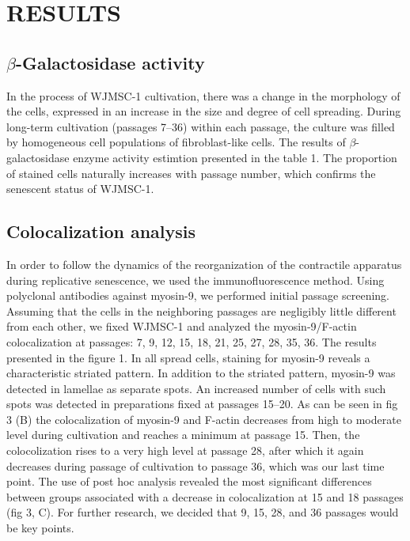 \documentclass[alpha-refs]{wiley-article}
\begin{document}
\section{RESULTS}

\subsection{$\beta$-Galactosidase activity}

In the process of WJMSC-1 cultivation, there was a change in the morphology of the cells, expressed in an increase in the size and degree of cell spreading.
During long-term cultivation (passages 7--36) within each passage, the culture was filled by homogeneous cell populations of fibroblast-like cells.
The results of $\beta$-galactosidase enzyme activity estimtion presented in the table 1.
The proportion of stained cells naturally increases with passage number, which confirms the senescent status of WJMSC-1.

\subsection{Colocalization analysis}

In order to follow the dynamics of the reorganization of the contractile apparatus during replicative senescence, we used the immunofluorescence method.
Using polyclonal antibodies against myosin-9, we performed initial passage screening.
Assuming that the cells in the neighboring passages are negligibly little different from each other, we fixed WJMSC-1 and analyzed the myosin-9/F-actin colocalization at passages: 7, 9, 12, 15, 18, 21, 25, 27, 28, 35, 36.
The results presented in the figure 1.
In all spread cells, staining for myosin-9 reveals a characteristic striated pattern.
In addition to the striated pattern, myosin-9 was detected in lamellae as separate spots.
An increased number of cells with such spots was detected in preparations fixed at passages 15--20.
As can be seen in fig 3 (B) the colocalization of myosin-9 and F-actin decreases from high to moderate level during cultivation and reaches a minimum at passage 15.
Then, the colocolization rises to a very high level at passage 28, after which it again decreases during passage of cultivation to passage 36, which was our last time point.
The use of post hoc analysis revealed the most significant differences between groups associated with a decrease in colocalization at 15 and 18 passages (fig 3, C).
For further research, we decided that 9, 15, 28, and 36 passages would be key points.
\end{document}
